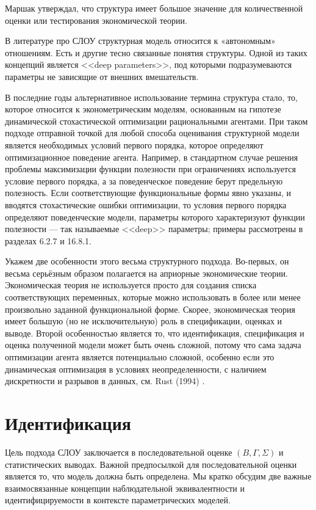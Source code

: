 	Маршак утверждал, что структура имеет большое значение для количественной оценки или тестирования экономической теории. 
	
	
	В литературе про СЛОУ структурная модель относится к «автономным» отношениям. Есть и другие тесно связанные понятия структуры. Одной из таких концепций является <<deep parameters>>, под которыми подразумеваются параметры не зависящие от внешних вмешательств. 
	
	
	В последние годы альтернативное использование термина структура стало, то, которое относится к эконометрическим моделям, основанным на гипотезе динамической стохастической оптимизации рациональными агентами. При таком подходе отправной точкой для любой способа оценивания структурной модели  является необходимых условий первого порядка, которое определяют оптимизационное поведение агента. Например, в стандартном случае  решения проблемы максимизации функции полезности при ограничениях используется условие первого порядка, а за поведенческое поведение берут предельную полезность. Если соответствующие функциональные формы явно указаны, и вводятся стохастические ошибки оптимизации, то условия первого порядка определяют поведенческие модели, параметры которого характеризуют функции полезности --- так называемые <<deep>> параметры; примеры рассмотрены в разделах 6.2.7 и 16.8.1. 


	Укажем две особенности этого весьма структурного подхода. Во-первых, он весьма серьёзным образом полагается на априорные экономические теории. Экономическая теория не используется просто для создания списка соответствующих переменных, которые можно использовать в более или менее произвольно заданной функциональной форме. Скорее,  экономическая теория имеет большую (но не исключительную) роль в спецификации, оценках и выводе. Второй особенностью является то, что идентификация, спецификация и оценка полученной модели может быть очень сложной, потому что сама задача оптимизации агента является потенциально сложной, особенно если это динамическая оптимизация в условиях неопределенности, с наличием дискретности и разрывов в данных, см. Rust (1994) .


\section{Идентификация}


Цель подхода СЛОУ заключается в последовательной оценке $(B,\Gamma,\Sigma)$ и статистических выводах. Важной предпосылкой для последовательной оценки является то, что модель должна быть определена. Мы кратко обсудим две важные  взаимосвязанные концепции наблюдательной эквивалентности и идентифицируемости в контексте параметрических моделей.


